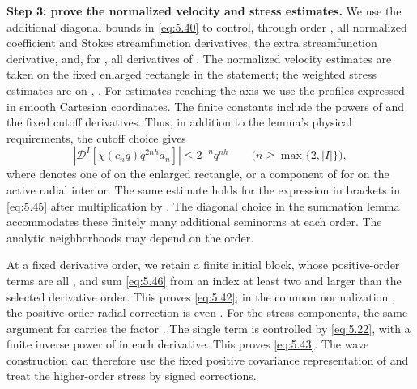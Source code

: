\textbf{Step 3: prove the normalized velocity and stress estimates.} We use the additional diagonal bounds in \eqref{eq:5.40} to control, through order , all normalized coefficient and Stokes streamfunction derivatives, the extra streamfunction derivative, and, for , all derivatives of . The normalized velocity estimates are taken on the fixed enlarged rectangle in the statement; the weighted stress estimates are on , . For estimates reaching the axis we use the profiles expressed in smooth Cartesian coordinates. The finite constants include the powers of  and the fixed cutoff derivatives. Thus, in addition to the lemma's physical requirements, the cutoff choice gives
\begin{equation}
 \left|\mathscr D^I\!\left[\chi(c_nq)q^{2nh}a_n\right]\right|
 \le 2^{-n}q^{nh}
 \qquad \bigl(n\ge\max\{2,|I|\}\bigr),
 \tag{5.46}\label{eq:5.46}
\end{equation}
where  denotes one of  on the enlarged rectangle, or a component of  for  on the active radial interior. The same estimate holds for the expression in brackets in \eqref{eq:5.45} after multiplication by . The diagonal choice in the summation lemma accommodates these finitely many additional seminorms at each order. The analytic neighborhoods may depend on the order.

At a fixed derivative order, we retain a finite initial block, whose positive-order terms are all , and sum \eqref{eq:5.46} from an index at least two and larger than the selected derivative order. This proves \eqref{eq:5.42}; in the common normalization , the positive-order radial correction is even . For the stress components, the same argument for  carries the factor . The single term  is controlled by \eqref{eq:5.22}, with a finite inverse power of  in each derivative. This proves \eqref{eq:5.43}. The wave construction can therefore use the fixed positive covariance representation of  and treat the higher-order stress by signed corrections.

